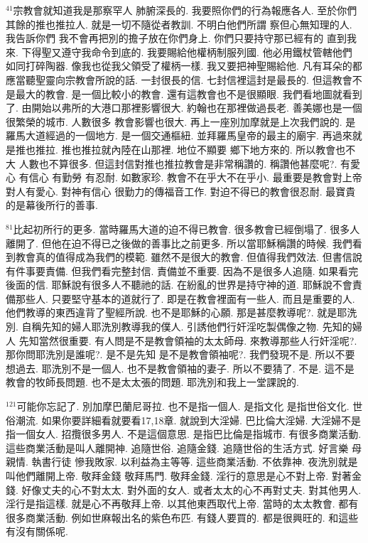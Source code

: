 \documentclass{book}
\begin{document}
$^{41}$宗教會就知道我是那察罕人 肺腑深長的.
我要照你們的行為報應各人.
至於你們其餘的推也推拉人.
就是一切不隨從者教訓.
不明白他們所謂 察但心無知理的人.
我告訴你們 我不會再把別的擔子放在你們身上.
你們只要持守那已經有的 直到我來.
下得聖又遵守我命令到底的.
我要賜給他權柄制服列國.
他必用鐵杖管轄他們 如同打碎陶器.
像我也從我父領受了權柄一樣.
我又要把神聖賜給他.
凡有耳朵的都應當聽聖靈向宗教會所說的話.
一封很長的信.
七封信裡這封是最長的.
但這教會不是最大的教會.
是一個比較小的教會.
還有這教會也不是很顯眼.
我們看地圖就看到了.
由開始以弗所的大港口那裡影響很大.
約翰也在那裡做過長老.
善美娜也是一個很繁榮的城市.
人數很多 教會影響也很大.
再上一座別加摩就是上次我們說的.
是羅馬大道經過的一個地方.
是一個交通樞紐.
並拜羅馬皇帝的最主的廟宇.
再過來就是推也推拉.
推也推拉就內陸在山那裡.
地位不顯要 鄉下地方來的.
所以教會也不大 人數也不算很多.
但這封信對推也推拉教會是非常稱讚的.
稱讚他甚麼呢?.
有愛心 有信心 有勤勞 有忍耐.
如數家珍.
教會不在乎大不在乎小.
最重要是教會對上帝對人有愛心.
對神有信心 很勤力的傳福音工作.
對迫不得已的教會很忍耐.
最寶貴的是幕後所行的善事.

$^{81}$比起初所行的更多.
當時羅馬大道的迫不得已教會.
很多教會已經倒塌了.
很多人離開了.
但他在迫不得已之後做的善事比之前更多.
所以當耶穌稱讚的時候.
我們看到教會真的值得成為我們的模範.
雖然不是很大的教會.
但值得我們效法.
但書信說有件事要責備.
但我們看完整封信.
責備並不重要.
因為不是很多人追隨.
如果看完後面的信.
耶穌說有很多人不聽祂的話.
在紛亂的世界是持守神的道.
耶穌說不會責備那些人.
只要堅守基本的道就行了.
即是在教會裡面有一些人.
而且是重要的人.
他們教導的東西違背了聖經所說.
也不是耶穌的心願.
那是甚麼教導呢?.
就是耶洗別.
自稱先知的婦人耶洗別教導我的僕人.
引誘他們行奸淫吃製偶像之物.
先知的婦人 先知當然很重要.
有人問是不是教會領袖的太太師母.
來教導那些人行奸淫呢?.
那你問耶洗別是誰呢?.
是不是先知 是不是教會領袖呢?.
我們發現不是.
所以不要想過去.
耶洗別不是一個人.
也不是教會領袖的妻子.
所以不要猜了.
不是.
這不是教會的牧師長問題.
也不是太太張的問題.
耶洗別和我上一堂課說的.

$^{121}$可能你忘記了.
別加摩巴蘭尼哥拉.
也不是指一個人.
是指文化 是指世俗文化.
世俗潮流.
如果你要詳細看就要看17,18章.
就說到大淫婦.
巴比倫大淫婦.
大淫婦不是指一個女人.
招攬很多男人.
不是這個意思.
是指巴比倫是指城市.
有很多商業活動.
這些商業活動是叫人離開神.
追隨世俗.
追隨金錢.
追隨世俗的生活方式.
好言樂 母親情.
執書行徒 慘我敗家.
以利益為主等等.
這些商業活動.
不依靠神.
夜洗別就是叫他們離開上帝.
敬拜金錢 敬拜馬門.
敬拜金錢.
淫行的意思是心不對上帝.
對著金錢.
好像丈夫的心不對太太.
對外面的女人.
或者太太的心不再對丈夫.
對其他男人.
淫行是指這樣.
就是心不再敬拜上帝.
以其他東西取代上帝.
當時的太太教會.
都有很多商業活動.
例如世麻報出名的紫色布匹.
有錢人要買的.
都是很興旺的.
和這些有沒有關係呢.
\end{document}
